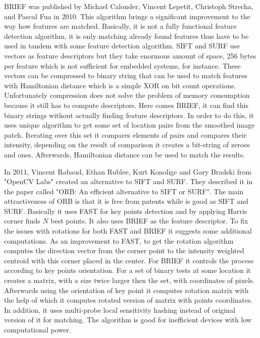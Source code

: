 \documentclass[../../../../main]{subfiles}
\begin{document}
\ac{BRIEF} was published by Michael Calonder, Vincent Lepetit, Christoph Strecha, and Pascal Fua in 2010. This algorithm brings a significant improvement to the way how features are matched. Basically, it is not a fully functional feature detection algorithm, it is only matching already found features thus have to be used in tandem with some feature detection algorithm. \ac{SIFT} and \ac{SURF} use vectors as feature descriptors but they take enormous amount of space, 256 bytes per feature which is not sufficient for embedded systems, for instance. These vectors can be compressed to binary string that can be used to match features with Hamiltonian distance which is a simple XOR on bit count operations. Unfortunately compression does not solve the problem of memory consumption because it still has to compute descriptors. Here comes \ac{BRIEF}, it can find this binary strings without actually finding feature descriptors. In order to do this, it uses unique algorithm to get some set of location pairs from the smoothed image patch. Iterating over this set it compares elements of pairs and compares their intensity, depending on the result of comparison it creates a bit-string of zeroes and ones. Afterwards, Hamiltonian distance can be used to match the results.

In 2011, Vincent Rabaud, Ethan Rublee, Kurt Konolige and Gary Bradski from "OpenCV Labs" created an alternative to \ac{SIFT} and \ac{SURF}. They described it in the paper called "ORB: An efficient alternative to \ac{SIFT} or \ac{SURF}". The main attractiveness of \ac{ORB} is that it is free from patents while is good as \ac{SIFT} and \ac{SURF}. 
Basically it uses \ac{FAST} for key points detection and by applying Harris corner finds $N$ best points. It also uses \ac{BRIEF} as the feature descriptor. To fix the issues with rotations for both \ac{FAST} and \ac{BRIEF} it suggests some additional computations. As an improvement to \ac{FAST}, to get the rotation algorithm computes the direction vector from the corner point to the intensity weighted centroid with this corner placed in the center. For \ac{BRIEF} it controls the process according to key points orientation. For a set of binary tests at some location it creates a matrix, with a size twice larger then the set, with coordinates of pixels. Afterwards using the orientation of key point it computes rotation matrix with the help of which it computes rotated version of matrix with points coordinates. In addition, it uses multi-probe local sensitivity hashing instead of original version of it for matching. The algorithm is good for inefficient devices with low computational power.
\end{document}
